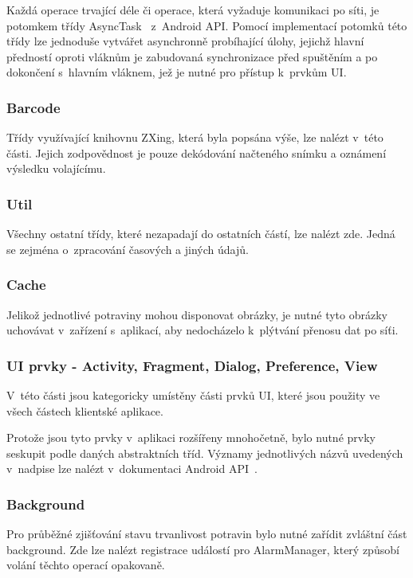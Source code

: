 \documentclass[thesis=B,czech]{FITthesis}[2013/10/20]
\begin{document}
Každá operace trvající déle či operace, která vyžaduje komunikaci po síti, je potomkem třídy AsyncTask~\cite{async_task} z~Android API. Pomocí implementací potomků této třídy lze jednoduše vytvářet asynchronně probíhající úlohy, jejichž hlavní předností oproti vláknům je zabudovaná synchronizace před spuštěním a po dokončení s~hlavním vláknem, jež je nutné pro přístup k~prvkům UI.

\subsubsection{Barcode}

Třídy využívající knihovnu ZXing, která byla popsána výše, lze nalézt v~této části. Jejich zodpovědnost je pouze dekódování načteného snímku a oznámení výsledku volajícímu.

\subsubsection{Util}

Všechny ostatní třídy, které nezapadají do ostatních částí, lze nalézt zde. Jedná se zejména o~zpracování časových a jiných údajů.

\subsubsection{Cache}

Jelikož jednotlivé potraviny mohou disponovat obrázky, je nutné tyto obrázky uchovávat v~zařízení s~aplikací, aby nedocházelo k~plýtvání přenosu dat po síťi.

\subsubsection{UI prvky - Activity, Fragment, Dialog, Preference, View}

V~této části jsou kategoricky umístěny části prvků UI, které jsou použity ve všech částech klientské aplikace.

Protože jsou tyto prvky v~aplikaci rozšířeny mnohočetně, bylo nutné prvky seskupit podle daných abstraktních tříd. Významy jednotlivých názvů uvedených v~nadpise lze nalézt v~dokumentaci Android API~\cite{android_api}. 

\subsubsection{Background}

Pro průběžné zjišťování stavu trvanlivost potravin bylo nutné zařídit zvláštní část background. Zde lze nalézt registrace událostí pro AlarmManager\cite{alarm_manager}, který způsobí volání těchto operací opakovaně.
\end{document}
